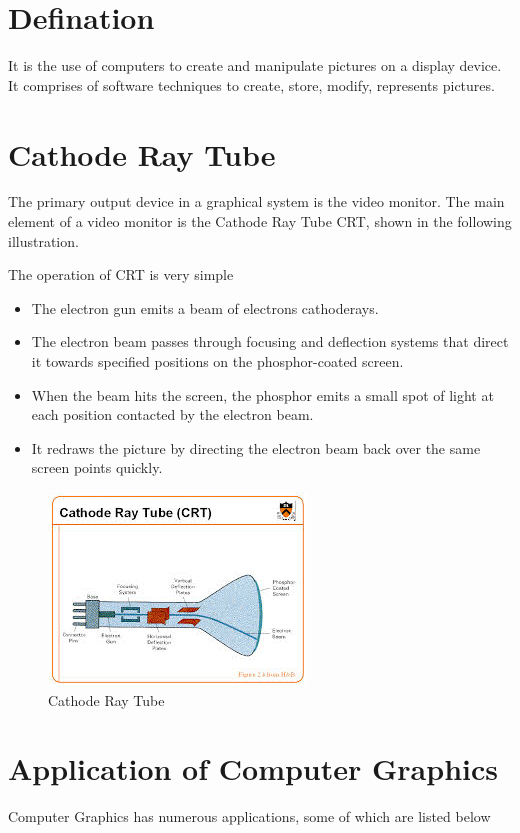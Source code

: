 \documentclass[a4paper]{article}
\begin{document}
\section*{Defination}

It is the use of computers to create and manipulate pictures on a display device. It comprises of software techniques to create, store, modify, represents pictures.
 \cleardoublepage
  
  \tableofcontents
  \thispagestyle{empty}
  \cleardoublepage
  
  \setcounter{page}{1}  
  
  \section{Cathode Ray Tube}
 The primary output device in a graphical system is the video monitor. The main element of a video monitor is the Cathode Ray Tube CRT, shown in the following illustration.

The operation of CRT is very simple 
 \begin{itemize}
  \item The electron gun emits a beam of electrons cathoderays.
  \item The electron beam passes through focusing and deflection systems that direct it towards specified positions on the phosphor-coated screen.
  \item When the beam hits the screen, the phosphor emits a small spot of light at each position contacted by the electron beam.
  \item It redraws the picture by directing the electron beam back over the same screen points quickly.
\end{itemize}
\begin{figure}[h]
\centering
\includegraphics{crt2}
\caption{Cathode Ray Tube}
\end{figure}

 \section{Application of Computer Graphics}
 Computer Graphics has numerous applications, some of which are listed below 
\end{document}
